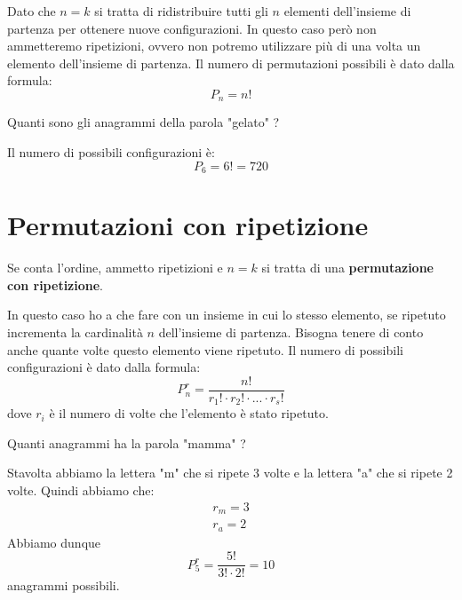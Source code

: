 Dato che $n = k$ si tratta di ridistribuire tutti gli $n$ elementi dell'insieme di partenza per
ottenere nuove configurazioni. In questo caso per\`o non ammetteremo ripetizioni, ovvero non
potremo utilizzare pi\`u di una volta un elemento dell'insieme di partenza.
Il numero di permutazioni possibili \`e dato dalla formula:
\begin{equation*}
	P_n = n!
\end{equation*}

\begin{example}
	Quanti sono gli anagrammi della parola "gelato" ?

	Il numero di possibili configurazioni \`e:
	\begin{equation*}
		P_{6} = 6! = 720
	\end{equation*}
\end{example}

\section{Permutazioni con ripetizione}
\begin{defn}
	Se conta l'ordine, ammetto ripetizioni e $n = k$ si tratta di una
	\textbf{permutazione con ripetizione}.
\end{defn}

In questo caso ho a che fare con un insieme in cui lo stesso elemento, se ripetuto incrementa
la cardinalit\`a $n$ dell'insieme di partenza. Bisogna tenere di conto anche quante volte
questo elemento viene ripetuto.
Il numero di possibili configurazioni \`e dato dalla formula:
\begin{equation*}
	P_n^r = \frac{n!}{r_1! \cdot r_2! \cdot ... \cdot r_s!}
\end{equation*}
dove $r_i$ \`e il numero di volte che l'elemento \`e stato ripetuto.

\begin{example}
	Quanti anagrammi ha la parola "mamma" ?

	Stavolta abbiamo la lettera "m" che si ripete 3 volte e la lettera "a" che si ripete 2 volte.
	Quindi abbiamo che:
	\begin{equation*}
		\begin{array}{c}
			r_m = 3 \\
			r_a = 2
		\end{array}
	\end{equation*}
	Abbiamo dunque
	\begin{equation*}
		P_5^r = \frac{5!}{3! \cdot 2!} = 10
	\end{equation*}
	anagrammi possibili.
\end{example}

